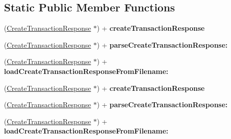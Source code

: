 \subsection*{Static Public Member Functions}
\begin{DoxyCompactItemize}
\item 
\hypertarget{interface_create_transaction_response_a3bb05bddb57502f370b5fd83d2b426b6}{
(\hyperlink{interface_create_transaction_response}{CreateTransactionResponse} $\ast$) + {\bfseries createTransactionResponse}}
\label{interface_create_transaction_response_a3bb05bddb57502f370b5fd83d2b426b6}

\item 
\hypertarget{interface_create_transaction_response_a759aa109df6c0bf9e46b6289da5190bf}{
(\hyperlink{interface_create_transaction_response}{CreateTransactionResponse} $\ast$) + {\bfseries parseCreateTransactionResponse:}}
\label{interface_create_transaction_response_a759aa109df6c0bf9e46b6289da5190bf}

\item 
\hypertarget{interface_create_transaction_response_a65bc8e23573f17b2749c3b44ba70e5e7}{
(\hyperlink{interface_create_transaction_response}{CreateTransactionResponse} $\ast$) + {\bfseries loadCreateTransactionResponseFromFilename:}}
\label{interface_create_transaction_response_a65bc8e23573f17b2749c3b44ba70e5e7}

\item 
\hypertarget{interface_create_transaction_response_a3bb05bddb57502f370b5fd83d2b426b6}{
(\hyperlink{interface_create_transaction_response}{CreateTransactionResponse} $\ast$) + {\bfseries createTransactionResponse}}
\label{interface_create_transaction_response_a3bb05bddb57502f370b5fd83d2b426b6}

\item 
\hypertarget{interface_create_transaction_response_a759aa109df6c0bf9e46b6289da5190bf}{
(\hyperlink{interface_create_transaction_response}{CreateTransactionResponse} $\ast$) + {\bfseries parseCreateTransactionResponse:}}
\label{interface_create_transaction_response_a759aa109df6c0bf9e46b6289da5190bf}

\item 
\hypertarget{interface_create_transaction_response_a65bc8e23573f17b2749c3b44ba70e5e7}{
(\hyperlink{interface_create_transaction_response}{CreateTransactionResponse} $\ast$) + {\bfseries loadCreateTransactionResponseFromFilename:}}
\label{interface_create_transaction_response_a65bc8e23573f17b2749c3b44ba70e5e7}


\end{DoxyCompactItemize}
